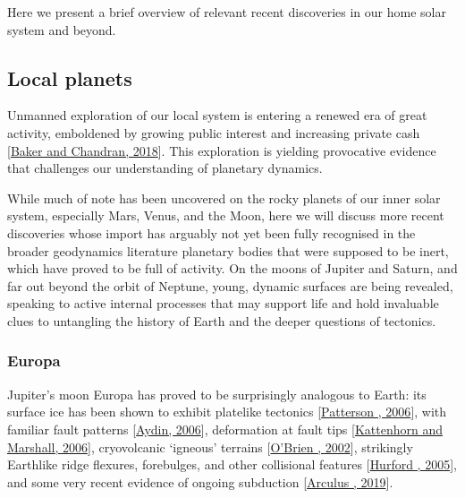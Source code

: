 \documentclass[letterpaper,10pt,english]{jupyterBook}
\begin{document}
\sphinxAtStartPar
Here we present a brief overview of relevant recent discoveries in our home solar system and beyond.


\subsection{Local planets}
\label{\detokenize{content/chapter_01_background/main:local-planets}}
\sphinxAtStartPar
Unmanned exploration of our local system is entering a renewed era of great activity, emboldened by growing public interest and increasing private cash {[}\hyperlink{cite.references:id588}{Baker and Chandran, 2018}{]}. This exploration is yielding provocative evidence that challenges our understanding of planetary dynamics.

\sphinxAtStartPar
While much of note has been uncovered on the rocky planets of our inner solar system, especially Mars, Venus, and the Moon, here we will discuss more recent discoveries whose import has arguably not yet been fully recognised in the broader geodynamics literature \sphinxhyphen{} planetary bodies that were supposed to be inert, which have proved to be full of activity. On the moons of Jupiter and Saturn, and far out beyond the orbit of Neptune, young, dynamic surfaces are being revealed, speaking to active internal processes that may support life \sphinxhyphen{} and hold invaluable clues to untangling the history of Earth and the deeper questions of tectonics.


\subsubsection{Europa}
\label{\detokenize{content/chapter_01_background/main:europa}}
\sphinxAtStartPar
Jupiter’s moon Europa has proved to be surprisingly analogous to Earth: its surface ice has been shown to exhibit plate\sphinxhyphen{}like tectonics {[}\hyperlink{cite.references:id148}{Patterson , 2006}{]}, with familiar fault patterns {[}\hyperlink{cite.references:id115}{Aydin, 2006}{]}, deformation at fault tips {[}\hyperlink{cite.references:id6}{Kattenhorn and Marshall, 2006}{]}, cryovolcanic ‘igneous’ terrains {[}\hyperlink{cite.references:id168}{O'Brien , 2002}{]}, strikingly Earth\sphinxhyphen{}like ridge flexures, forebulges, and other collisional features {[}\hyperlink{cite.references:id138}{Hurford , 2005}{]}, and some very recent evidence of ongoing subduction {[}\hyperlink{cite.references:id509}{Arculus , 2019}{]}.
\end{document}
